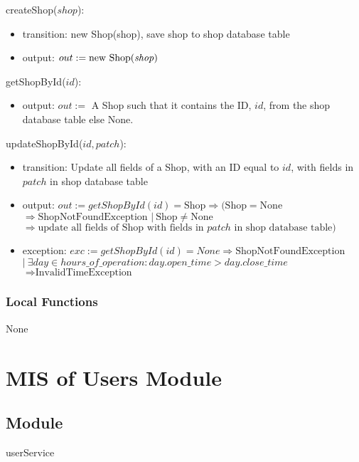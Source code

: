 \documentclass[12pt, titlepage]{article}
\begin{document}
\noindent createShop($shop$):
\begin{itemize}
	\item transition: new Shop(shop), save shop to shop database table
	\item output: $out := \text{new Shop(\emph{shop})}$
\end{itemize}

\noindent getShopById($id$):
\begin{itemize}
	\item output: $out :=$ A Shop such that it contains the ID, $id$, from the shop database table else None.
\end{itemize}

\noindent updateShopById($id, patch$):
\begin{itemize}
	\item transition: Update all fields of a Shop, with an ID equal to $id$, with fields in $patch$ in shop
	      database table
	\item output: $out := getShopById(id) = \text{Shop} \Rightarrow (\text{Shop} = \text{None} $ \\
		      $\Rightarrow \text{ShopNotFoundException } |\ \text{Shop} \neq \text{None}$ \\ $\Rightarrow
		      \text{update all fields of Shop with fields in } patch \text{ in shop database table})$
	\item exception: $exc := getShopById(id) = None \Rightarrow \text{ShopNotFoundException}$ \\ $|\ \exists
		      day \in hours\_of\_operation : day.open\_time > day.close\_time$ \\ $\Rightarrow
		      \text{InvalidTimeException}$
\end{itemize}

\subsubsection{Local Functions}

None

\newpage

\section{MIS of Users Module} \label{mUsers}
\subsection{Module}

userService
\end{document}
